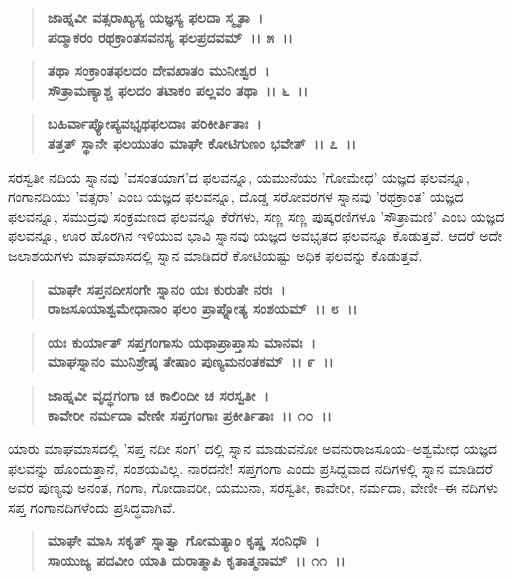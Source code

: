 \begin{verse}
\textbf{ಜಾಹ್ನವೀ ವತ್ಸರಾಖ್ಯಸ್ಯ ಯಜ್ಞಸ್ಯ ಫಲದಾ ಸ್ಮೃತಾ~।}\\\textbf{ಪದ್ಮಾಕರಂ ರಥಕ್ರಾಂತಸವನಸ್ಯ ಫಲಪ್ರದವಮ್~।। ೫~।।} 
\end{verse}

\begin{verse}
\textbf{ತಥಾ ಸಂಕ್ರಾಂತಫಲದಂ ದೇವಖಾತಂ ಮುನೀಶ್ವರ~।}\\\textbf{ಸೌತ್ರಾಮಣ್ಯಾಶ್ಚ ಫಲದಂ ತಟಾಕಂ ಪಲ್ಲವಂ ತಥಾ~।। ೬~।।} 
\end{verse}

\begin{verse}
\textbf{ಬಹಿರ್ವಾಪ್ಯೋಪ್ಯವಭೃಥಫಲದಾಃ ಪರಿಕೀರ್ತಿತಾಃ~।}\\\textbf{ತತ್ತತ್ ಸ್ಥಾನೇ ಫಲಯುತಂ ಮಾಘೇ ಕೋಟಿಗುಣಂ ಭವೇತ್~।। ೭~।।}
\end{verse}

ಸರಸ್ವತೀ ನದಿಯ ಸ್ನಾನವು 'ವಸಂತಯಾಗ'ದ ಫಲವನ್ನೂ, ಯಮುನೆಯು 'ಗೋಮೇಧ' ಯಜ್ಞದ ಫಲವನ್ನೂ, ಗಂಗಾನದಿಯು 'ವತ್ಸರಾ' ಎಂಬ ಯಜ್ಞದ ಫಲವನ್ನೂ, ದೊಡ್ಡ ಸರೋವರಗಳ ಸ್ನಾನವು 'ರಥಕ್ರಾಂತ' ಯಜ್ಞದ ಫಲವನ್ನೂ, ಸಮುದ್ರವು ಸಂಕ್ರಮಣದ ಫಲವನ್ನೂ ಕೆರೆಗಳು, ಸಣ್ಣ ಸಣ್ಣ ಪುಷ್ಕರಣಿಗಳೂ 'ಸೌತ್ರಾಮಣಿ' ಎಂಬ ಯಜ್ಞದ ಫಲವನ್ನೂ, ಊರ ಹೊರಗಿನ ಇಳಿಯುವ ಭಾವಿ ಸ್ನಾನವು ಯಜ್ಞದ ಅವಭೃತದ ಫಲವನ್ನೂ ಕೊಡುತ್ತವೆ. ಆದರೆ ಅದೇ ಜಲಾಶಯಗಳು ಮಾಘಮಾಸದಲ್ಲಿ ಸ್ನಾನ ಮಾಡಿದರೆ ಕೋಟಿಯಷ್ಟು ಅಧಿಕ ಫಲವನ್ನು ಕೊಡುತ್ತವೆ.

\begin{verse}
\textbf{ಮಾಘೇ ಸಪ್ತನದೀಸಂಗೇ ಸ್ನಾನಂ ಯಃ ಕುರುತೇ ನರಃ~।}\\\textbf{ರಾಜಸೂಯಾಶ್ವಮೇಧಾನಾಂ ಫಲಂ ಪ್ರಾಪ್ನೋತ್ಯ ಸಂಶಯಮ್~।। ೮~।। }
\end{verse}

\begin{verse}
\textbf{ಯಃ ಕುರ್ಯಾತ್ ಸಪ್ತಗಂಗಾಸು ಯಥಾಪ್ರಾಪ್ತಾಸು ಮಾನವಃ~।}\\\textbf{ಮಾಘಸ್ನಾನಂ ಮುನಿಶ್ರೇಷ್ಠ ತೇಷಾಂ ಪುಣ್ಯಮನಂತಕಮ್~।। ೯~।। }
\end{verse}

\begin{verse}
\textbf{ಜಾಹ್ನವೀ ವೃದ್ಧಗಂಗಾ ಚ ಕಾಲಿಂದೀ ಚ ಸರಸ್ವತೀ~।}\\\textbf{ಕಾವೇರೀ ನರ್ಮದಾ ವೇಣೀ ಸಪ್ತಗಂಗಾಃ ಪ್ರಕೀರ್ತಿತಾಃ~।। ೧೦~।।}
\end{verse}

ಯಾರು ಮಾಘಮಾಸದಲ್ಲಿ 'ಸಪ್ತ ನದೀ ಸಂಗ' ದಲ್ಲಿ ಸ್ನಾನ ಮಾಡುವನೋ ಅವನು\break ರಾಜಸೂಯ–ಅಶ್ವಮೇಧ ಯಜ್ಞದ ಫಲವನ್ನು ಹೊಂದುತ್ತಾನೆ, ಸಂಶಯವಿಲ್ಲ. ನಾರದನೇ! ಸಪ್ತಗಂಗಾ ಎಂದು ಪ್ರಸಿದ್ದವಾದ ನದಿಗಳಲ್ಲಿ ಸ್ನಾನ ಮಾಡಿದರೆ ಅವರ ಪುಣ್ಯವು ಅನಂತ, ಗಂಗಾ, ಗೋದಾವರೀ, ಯಮುನಾ, ಸರಸ್ವತೀ, ಕಾವೇರೀ, ನರ್ಮದಾ, ವೇಣೀ–ಈ ನದಿಗಳು ಸಪ್ತ ಗಂಗಾನದಿಗಳೆಂದು ಪ್ರಸಿದ್ಧವಾಗಿವೆ.

\begin{verse}
\textbf{ಮಾಘೇ ಮಾಸಿ ಸಕೃತ್ ಸ್ನಾತ್ವಾ ಗೋಮತ್ಯಾಂ ಕೃಷ್ಣ ಸಂನಿಧೌ~।}\\\textbf{ಸಾಯುಜ್ಯ ಪದವೀಂ ಯಾತಿ ದುರಾತ್ಮಾಪಿ ಕೃತಾತ್ಮನಾಮ್~।। ೧೧~।। }
\end{verse}

